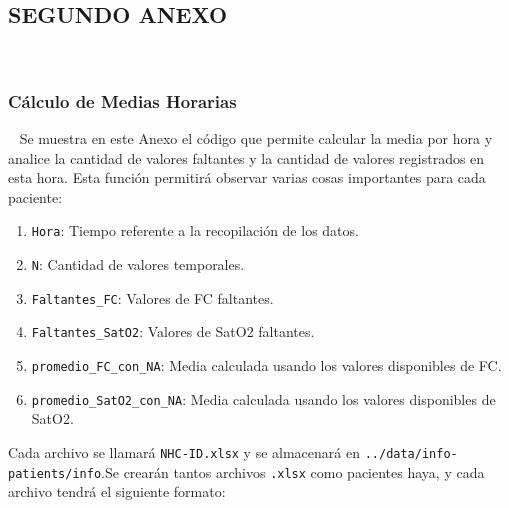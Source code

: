 \subsection{SEGUNDO ANEXO}~\label{sec:anexo2}

\subsubsection{Cálculo de Medias Horarias}~\label{sec:calculo-medias-horarias}
Se muestra en este Anexo el código que permite calcular la media por hora y analice la cantidad de valores faltantes y la cantidad de valores registrados en esta hora. Esta función permitirá observar varias cosas importantes para cada paciente:

\begin{enumerate}
    \item \texttt{Hora}: Tiempo referente a la recopilación de los datos.
    
    \item \texttt{N}: Cantidad de valores temporales.
    
    \item \texttt{Faltantes\_FC}: Valores de FC faltantes.
    
    \item \texttt{Faltantes\_SatO2}: Valores de SatO2 faltantes.
    
    \item \texttt{promedio\_FC\_con\_NA}: Media calculada usando los valores disponibles de FC.
    
    \item \texttt{promedio\_SatO2\_con\_NA}: Media calculada usando los valores disponibles de SatO2.
\end{enumerate}

Cada archivo se llamará \texttt{NHC-ID.xlsx} y se almacenará en \texttt{../data/info-patients/info}.Se crearán tantos archivos \texttt{.xlsx} como pacientes haya, y cada archivo tendrá el siguiente formato:

